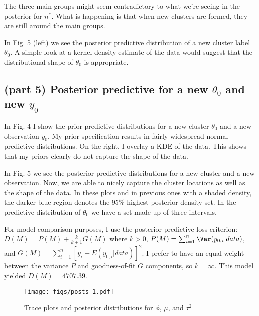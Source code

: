 \documentclass[12pt]{article}
\begin{document}
The three main groups might seem contradictory to what we're seeing in the posterior for $n^*$. What is happening is that when new clusters are formed, they are still around the main groups.

In Fig. 5 (left) we see the posterior predictive distribution of a new cluster label $\theta_0$. A simple look at a kernel density estimate of the data would suggest that the distributional shape of $\theta_0$ is appropriate.

\subsection*{(part 5) Posterior predictive for a new $\theta_0$ and new $y_0$}

In Fig. 4 I show the prior predictive distributions for a new cluster $\theta_0$ and a new observation $y_0$. My prior specification results in fairly widespread normal predictive distributions. On the right, I overlay a KDE of the data. This shows that my priors clearly do not capture the shape of the data.

In Fig. 5 we see the posterior predictive distributions for a new cluster and a new observation. Now, we are able to nicely capture the cluster locations as well as the shape of the data. In these plots and in previous ones with a shaded density, the darker blue region denotes the 95\% highest posterior density set. In the predictive distribution of $\theta_0$ we have a set made up of three intervals.

For model comparison purposes, I use the posterior predictive loss criterion: $D(M)=P(M)+\frac{k}{k+1}G(M)$ where $k>0$, $P(M) = \sum_{i=1}^n \Var(y_{0,i}|data)$, and $G(M) = \sum_{i=1}^n[y_i-E(y_{0,i}|data)]^2$. I prefer to have an equal weight between the variance $P$ and goodness-of-fit $G$ components, so $k=\infty$. This model yielded $D(M)=4707.39$.
 
\newpage


\begin{figure}[H]
\begin{center}
\texttt{[image: figs/posts\_1.pdf]}
\caption{Trace plots and posterior distributions for $\phi$, $\mu$, and $\tau^2$}
\end{center}
\end{figure}
\end{document}
